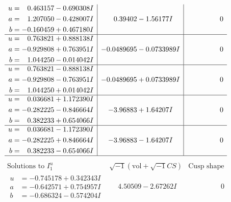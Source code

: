 \documentclass[1p]{elsarticle_modified}
\theoremstyle{definition}
\newcommand{\I}{\sqrt{-1}}
\begin{document}
$$\begin{array}{c|c|c}
\begin{aligned}
u &= \phantom{-}0.463157 - 0.690308 I \\
a &= \phantom{-}1.207050 - 0.428007 I \\
b &= -0.160459 + 0.467180 I\end{aligned}
 & \phantom{-}0.39402 - 1.56177 I & \phantom{-0.000000 } 0 \\ \hline\begin{aligned}
u &= \phantom{-}0.763821 + 0.888138 I \\
a &= -0.929808 + 0.763951 I \\
b &= \phantom{-}1.044250 - 0.014042 I\end{aligned}
 & -0.0489695 - 0.0733989 I & \phantom{-0.000000 } 0 \\ \hline\begin{aligned}
u &= \phantom{-}0.763821 - 0.888138 I \\
a &= -0.929808 - 0.763951 I \\
b &= \phantom{-}1.044250 + 0.014042 I\end{aligned}
 & -0.0489695 + 0.0733989 I & \phantom{-0.000000 } 0 \\ \hline\begin{aligned}
u &= \phantom{-}0.036681 + 1.172390 I \\
a &= -0.282225 - 0.846664 I \\
b &= \phantom{-}0.382233 + 0.654066 I\end{aligned}
 & -3.96883 + 1.64207 I & \phantom{-0.000000 } 0 \\ \hline\begin{aligned}
u &= \phantom{-}0.036681 - 1.172390 I \\
a &= -0.282225 + 0.846664 I \\
b &= \phantom{-}0.382233 - 0.654066 I\end{aligned}
 & -3.96883 - 1.64207 I & \phantom{-0.000000 } 0\\
 \hline 
 \end{array}$$\newpage$$\begin{array}{c|c|c}  
\text{Solutions to }I^u_{1}& \I (\text{vol} + \sqrt{-1}CS) & \text{Cusp shape}\\
 \hline 
\begin{aligned}
u &= -0.745178 + 0.342343 I \\
a &= -0.642571 + 0.754957 I \\
b &= -0.686324 - 0.574204 I\end{aligned}
 & \phantom{-}4.50509 - 2.67262 I & \phantom{-0.000000 } 0 \\ \hline\begin{aligned}

\end{aligned}
\end{array}$$
\end{document}
